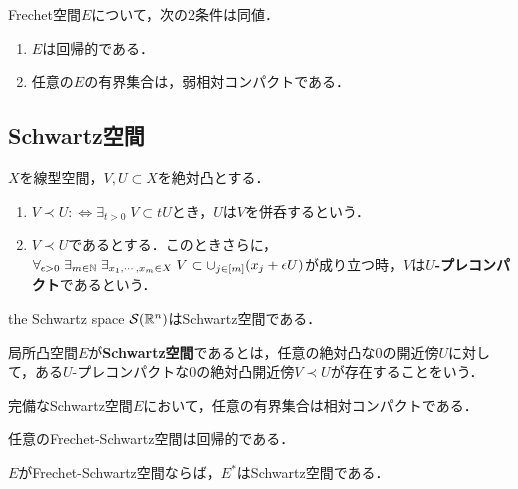 \documentclass[uplatex,dvipdfmx]{jsreport}
\begin{document}
\begin{theorem}
    Frechet空間$E$について，次の2条件は同値．
    \begin{enumerate}
        \item $E$は回帰的である．
        \item 任意の$E$の有界集合は，弱相対コンパクトである．
    \end{enumerate}
\end{theorem}

\subsection{Schwartz空間}

\begin{definition}[precompact]
    $X$を線型空間，$V,U\subset X$を絶対凸とする．
    \begin{enumerate}
        \item $V\prec U:\Leftrightarrow\exists_{t>0}\;V\subset tU$とき，$U$は$V$を併呑するという．
        \item $V\prec U$であるとする．このときさらに，$\forall_{\epsilon>0}\;\exists_{m\in\mathbb{N}}\;\exists_{x_1,\cdots,x_m\in X}\;V\subset\cup_{j\in[m]}(x_j+\epsilon U)$が成り立つ時，$V$は\textbf{$U$-プレコンパクト}であるという．
    \end{enumerate}
\end{definition}

\begin{example}
    the Schwartz space $\mathcal{S}(\mathbb{R}^n)$はSchwartz空間である．
\end{example}

\begin{definition}
    局所凸空間$E$が\textbf{Schwartz空間}であるとは，任意の絶対凸な$0$の開近傍$U$に対して，ある$U$-プレコンパクトな$0$の絶対凸開近傍$V\prec U$が存在することをいう．
\end{definition}

\begin{lemma}
    完備なSchwartz空間$E$において，任意の有界集合は相対コンパクトである．
\end{lemma}

\begin{theorem}
    任意のFrechet-Schwartz空間は回帰的である．
\end{theorem}

\begin{theorem}
    $E$がFrechet-Schwartz空間ならば，$E^*$はSchwartz空間である．
\end{theorem}
\end{document}
